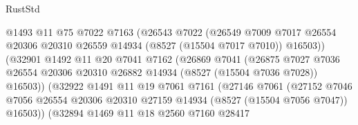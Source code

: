 \begin{lexlean}{RustStd}
\begin{coremodule}
                                @1493
                                @11
                                @75
                                @7022
                                @7163
                                (@26543
                                  @7022
                                  (@26549
                                    @7009
                                    @7017
                                    @26554
                                    @20306
                                    @20310
                                    @26559
                                    @14934
                                    (@8527 (@15504 @7017 @7010))
                                    @16503))
                                (@32901
                                  @1492
                                  @11
                                  @20
                                  @7041
                                  @7162
                                  (@26869
                                    @7041
                                    (@26875
                                      @7027
                                      @7036
                                      @26554
                                      @20306
                                      @20310
                                      @26882
                                      @14934
                                      (@8527 (@15504 @7036 @7028))
                                      @16503))
                                  (@32922
                                    @1491
                                    @11
                                    @19
                                    @7061
                                    @7161
                                    (@27146
                                      @7061
                                      (@27152
                                        @7046
                                        @7056
                                        @26554
                                        @20306
                                        @20310
                                        @27159
                                        @14934
                                        (@8527 (@15504 @7056 @7047))
                                        @16503))
                                    (@32894
                                      @1469
                                      @11
                                      @18
                                      @2560
                                      @7160
                                      @28417

\end{coremodule}
\end{lexlean}
